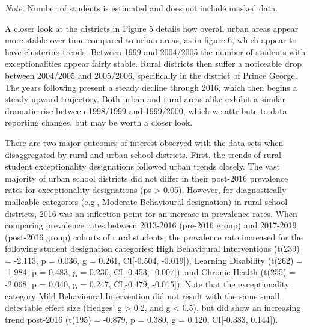 \documentclass[
  english,
  man,floatsintext]{apa6}
\begin{document}
\begin{table}[tbp]
\begin{center}
\begin{threeparttable}
\begin{tablenotes}[para]
\normalsize{\textit{Note.} Number of students is estimated and does not include masked data.}
\end{tablenotes}

\end{threeparttable}
\end{center}

\end{table}

A closer look at the districts in Figure 5 details how overall urban areas appear more stable over time compared to urban areas, as in figure 6, which appear to have clustering trends. Between 1999 and 2004/2005 the number of students with exceptionalities appear fairly stable. Rural districts then suffer a noticeable drop between 2004/2005 and 2005/2006, specifically in the district of Prince George. The years following present a steady decline through 2016, which then begins a steady upward trajectory. Both urban and rural areas alike exhibit a similar dramatic rise between 1998/1999 and 1999/2000, which we attribute to data reporting changes, but may be worth a closer look.

There are two major outcomes of interest observed with the data sets when disaggregated by rural and urban school districts. First, the trends of rural student exceptionality designations followed urban trends closely. The vast majority of urban school districts did not differ in their post-2016 prevalence rates for exceptionality designations (ps \textgreater{} 0.05). However, for diagnostically malleable categories (e.g., Moderate Behavioural designation) in rural school districts, 2016 was an inflection point for an increase in prevalence rates. When comparing prevalence rates between 2013-2016 (pre-2016 group) and 2017-2019 (post-2016 group) cohorts of rural students, the prevalence rate increased for the following student designation categories: High Behavioural Interventions (t(239) = -2.113, p = 0.036, g = 0.261, CI{[}-0.504, -0.019{]}), Learning Disability (t(262) = -1.984, p = 0.483, g = 0.230, CI{[}-0.453, -0.007{]}), and Chronic Health (t(255) = -2.068, p = 0.040, g = 0.247, CI{[}-0.479, -0.015{]}). Note that the exceptionality category Mild Behavioural Intervention did not result with the same small, detectable effect size (Hedges' g \textgreater{} 0.2, and g \textless{} 0.5), but did show an increasing trend post-2016 (t(195) = -0.879, p = 0.380, g = 0.120, CI{[}-0.383, 0.144{]}).
\end{document}

